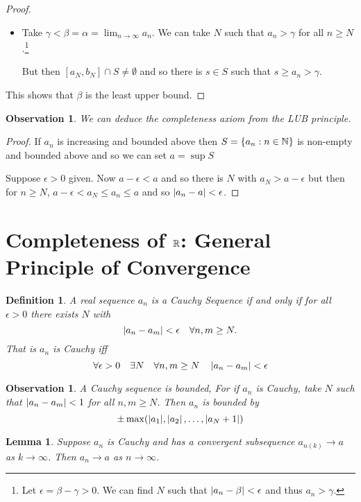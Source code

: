 \documentclass{notes}
\theoremstyle{plain}
\newtheorem{observation}[proposition]{Observation}
\newtheorem{definition}[proposition]{Definition}
\newtheorem{lemma}[proposition]{Lemma}
\newcommand{\Forall}[1]{\forall #1 \quad}
\newcommand{\Exists}[1]{\exists #1 \quad}
\begin{document}
\begin{proof}
\begin{itemize}
\item Take $\gamma < \beta = \alpha = \lim_{n \to
    \infty}a_{n}$.  We can take $ N $ such that $ a_{n} > \gamma $ for
  all $ n \geq N $.\footnote{Let $\epsilon = \beta - \gamma
    >0$.  We can find $ N $ such that $\left|a_{n} - \beta\right| < \epsilon$ and thus
    $ a_{n} > \gamma $.}

But then $ \left[a_{N}, b_{N}\right] \cap S \neq \emptyset$ and
so there is $ s \in S $ such that $s \geq a_{n} > \gamma$.
\end{itemize}

This shows that $ \beta $ is the least upper bound.

\end{proof}

\begin{observation}
We can deduce the completeness axiom from the LUB principle.
\end{observation}

\begin{proof}
If $ a_{n} $ is increasing and bounded above then $S= \{a_{n}: 
n \in \mathbb{N} \}$ is non-empty and bounded above and so we can set
$a = \sup S$

Suppose $ \epsilon>0 $ given. Now $a - \epsilon < a$ and so there 
is $ N $ with $a_{N}>a-\epsilon$ but then for $ n \geq N $,
$a- \epsilon < a_{N} \leq a_{n} \leq a$ and so $\left|a_{n} -a \right| < 
\epsilon$.
\end{proof}
 
\section{Completeness of $ \mathbb{R} $: General Principle of Convergence}
\begin{definition}
A real sequence $ a_{n} $ is a \emph{Cauchy Sequence} if and only 
if for all $ \epsilon > 0  $ there exists $ N $ with
\[
\left|a_{n}-a_{m}\right|< \epsilon \quad \forall n,m \ge N.
\]
That is $ a_{n} $ is Cauchy iff \[ \Forall{\epsilon >0} \Exists{N} \Forall{
n,m \geq N} \abs{a_{n}-a_{m}}<\epsilon \]
\end{definition}

\begin{observation}
A Cauchy sequence is bounded, For if $ a_{n}  $ is Cauchy, take $ N 
$ such that $\left|a_{n}-a_{m}\right|<1$ for all $ n, m \geq N $. 
Then $ a_{n}$ is bounded by \[ \pm \max( |a_{1}|, \left|a_{2}\right|, \ldots, 
\left|a_{N}+1\right|) \]
\end{observation}

\begin{lemma}
\label{l1.1}
Suppose $ a_{n}$ is Cauchy and has a convergent subsequence
$a_{n(k)} \to a$ as $ k \to \infty $. Then $a_{n}
\to a$ as $n \to \infty$.
\end{lemma}
\end{document}
